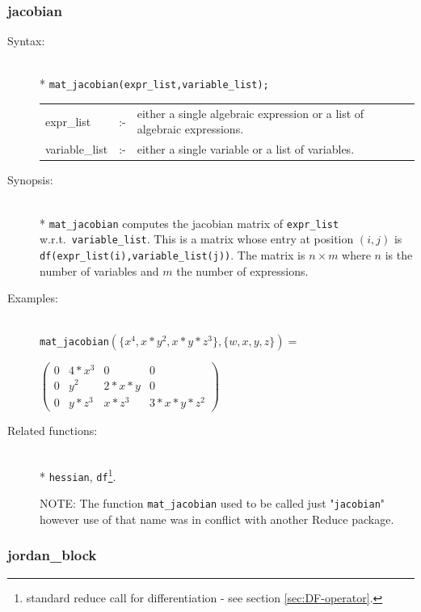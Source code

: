 {\subsubsection{jacobian}
\label{linalg:mat_jacobian}
\hypertarget{operator:JACOBIAN}{}

\begin{description}
\item[Syntax:]\mbox{}\\*
\texttt{mat\_jacobian(expr\_list,variable\_list);}\\[2mm]
\begin{tabular}{l l p{.72\linewidth}}
expr\_list  &:-& either a
single algebraic expression or a list of algebraic expressions.\\
variable\_list &:-& either a single variable or a list of variables.
\end{tabular}

\item[Synopsis:]\mbox{}\\*
\texttt{mat\_jacobian} computes the jacobian matrix of \texttt{expr\_list} w.r.t.\
\texttt{variable\_list}.
This is a matrix whose entry at position $(i,j)$
is \texttt{df(expr\_list(i),variable\_list(j))}.  The matrix is $n\times m$
where $n$ is the number of variables and $m$ the number of expressions.

\item[Examples:]\mbox{}\\
  \texttt{mat\_jacobian}\((\{x^4,x*y^2,x*y*z^3\},\{w,x,y,z\}) =\)

  \(\begin{pmatrix} 0 & 4*x^3 & 0 & 0 \\ 0 & y^2 & 2*x*y & 0 \\
  0 & y*z^3 & x*z^3 & 3*x*y*z^2
  \end{pmatrix}\)

\item[Related functions:]\mbox{}\\*
\texttt{hessian}, \texttt{df}\footnote{standard reduce call
for differentiation - see section \protect\ref{sec:DF-operator}.}.

NOTE: The function \texttt{mat\_jacobian} used to be called just "\texttt{jacobian}"
however use of that name was in conflict with another Reduce package.
\end{description}


\subsubsection{jordan\_block}
\label{linalg:jordan_block}
\hypertarget{operator:JORDAN_BLOCK}{}

}
